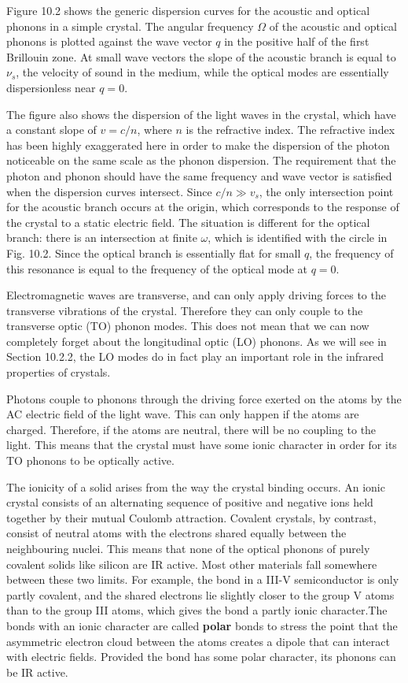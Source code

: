 \documentclass[12pt]{book}
\begin{document}
Figure 10.2 shows the generic dispersion curves for the acoustic and optical phonons in a simple crystal. The angular frequency $\Omega$ of the acoustic and optical phonons is plotted against the wave vector $q$ in the positive half of the first Brillouin zone. At small wave vectors the slope of the acoustic branch is equal to $\nu_s$, the velocity of sound in the medium, while the optical modes are essentially dispersionless near $q = 0$.

The figure also shows the dispersion of the light waves in the crystal, which have a constant slope of $v = c / n$, where $n$ is the refractive index. The refractive index has been highly exaggerated here in order to make the dispersion of the photon noticeable on the same scale as the phonon dispersion. The requirement that the photon and phonon should have the same frequency and wave vector is satisfied when the dispersion curves intersect. Since $c/n\gg v_s$, the only intersection point for the acoustic branch occurs at the origin, which corresponds to the response of the crystal to a static electric field. The situation is different for the optical branch: there is an intersection at finite $\omega$, which is identified with the circle in Fig. 10.2. Since the optical branch is essentially flat for small $q$, the frequency of this resonance is equal to the frequency of the optical mode at $q = 0$.

Electromagnetic waves are transverse, and can only apply driving forces to the transverse vibrations of the crystal. Therefore they can only couple to the transverse optic (TO) phonon modes. This does not mean that we can now completely forget about the longitudinal optic (LO) phonons. As we will see in Section 10.2.2, the LO modes do in fact play an important role in the infrared properties of crystals.

Photons couple to phonons through the driving force exerted on the atoms by the AC electric field of the light wave. This can only happen if the atoms are charged. Therefore, if the atoms are neutral, there will be no coupling to the light. This means that the crystal must have some ionic character in order for its TO phonons to be optically active.

The ionicity of a solid arises from the way the crystal binding occurs. An ionic crystal consists of an alternating sequence of positive and negative ions held together by their mutual Coulomb attraction. Covalent crystals, by contrast, consist of neutral atoms with the electrons shared equally between the neighbouring nuclei. This means that none of the optical phonons of purely covalent solids like silicon are IR active. Most other materials fall somewhere between these two limits. For example, the bond in a III-V semiconductor is only partly covalent, and the shared electrons lie slightly closer to the group V atoms than to the group III atoms, which gives the bond a partly ionic character.The bonds with an ionic character are called \textbf{polar} bonds to stress the point that the asymmetric electron cloud between the atoms creates a dipole that can interact with electric fields. Provided the bond has some polar character, its phonons can be IR active.
\end{document}
